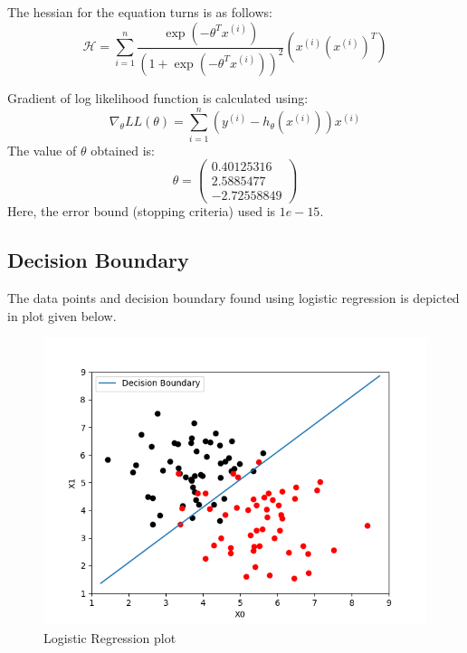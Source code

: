 \documentclass[12pt]{article}
\begin{document}
The hessian for the equation turns is as follows:
\begin{equation}
    \mathcal{H}=\sum_{i=1}^{n} \frac{\exp \left(-\theta^{T} x^{(i)}\right)}{\left(1+\exp \left(-\theta^{T} x^{(i)}\right)\right)^{2}}\left(x^{(i)} (x^{(i)})^T\right)
\end{equation}

Gradient of log likelihood function is calculated using:
$$
\nabla_{\theta} L L(\theta)=\sum_{i=1}^{n}\left(y^{(i)}-h_{\theta}\left(x^{(i)}\right)\right) x^{(i)}
$$
The value of $\theta$ obtained is:
\begin{equation}
    \theta=
    \begin{pmatrix}
        0.40125316\\
        2.5885477\\
        -2.72558849
    \end{pmatrix}
\end{equation}
Here, the error bound (stopping criteria) used is $1e-15$.
\subsection{Decision Boundary} The data points and decision boundary found using logistic regression is depicted in plot given below.
\begin{figure}[H]
  \includegraphics[width=\linewidth]{logisticRegressionPlot.png}
  \caption{Logistic Regression plot}
  \label{fig3A}
\end{figure}
\end{document}
